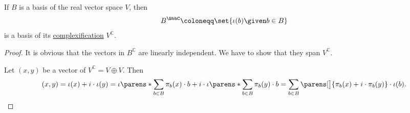 \begin{proposition}\label{thm:basis_of_complexification}
  If \( B \) is a basis of the real vector space \( V \), then
  \begin{equation*}
    B^\BbbC \coloneqq \set{ \iota(b) \given b \in B }
  \end{equation*}
  is a basis of its \hyperref[def:complexification]{complexification} \( V^\BbbC \).
\end{proposition}
\begin{proof}
  It is obvious that the vectors in \( B^\BbbC \) are linearly independent. We have to show that they span \( V^\BbbC \).

  Let \( (x, y) \) be a vector of \( V^\BbbC = V \oplus V \). Then
  \begin{equation*}
    (x, y)
    =
    \iota(x) + i \cdot \iota(y)
    =
    \iota\parens*{ \sum_{b \in B} \pi_b(x) \cdot b } + i \cdot \iota\parens*{ \sum_{b \in B} \pi_b(y) \cdot b }
    =
    \sum_{b \in B} \parens[\big]{ \pi_b(x) + i \cdot \pi_b(y) } \cdot \iota(b).
  \end{equation*}
\end{proof}

